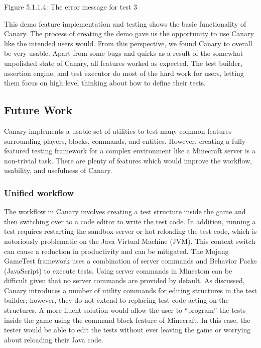 \documentclass{article}
\begin{document}
\begin{onehalfspacing}
Figure 5.1.1.4: The error message for test 3

This demo feature implementation and testing shows the basic
functionality of Canary. The process of creating the demo gave us the
opportunity to use Canary like the intended users would. From this
perspective, we found Canary to overall be very usable. Apart from some
bugs and quirks as a result of the somewhat unpolished state of Canary,
all features worked as expected. The test builder, assertion engine, and
test executor do most of the hard work for users, letting them focus on
high level thinking about how to define their tests.

\subsection{Future Work}

Canary implements a usable set of utilities to test many common features
surrounding players, blocks, commands, and entities. However, creating a
fully-featured testing framework for a complex environment like a
Minecraft server is a non-trivial task. There are plenty of features
which would improve the workflow, usability, and usefulness of Canary.

\subsubsection{Unified workflow}

The workflow in Canary involves creating a test structure inside the
game and then switching over to a code editor to write the test code. In
addition, running a test requires restarting the sandbox server or hot
reloading the test code, which is notoriously problematic on the Java
Virtual Machine (JVM). This context switch can cause a reduction in
productivity and can be mitigated. The Mojang GameTest framework uses a
combination of server commands and Behavior Packs (JavaScript) to
execute tests. Using server commands in Minestom can be difficult given
that no server commands are provided by default. As discussed, Canary
introduces a number of utility commands for editing structures in the
test builder; however, they do not extend to replacing test code acting
on the structures. A more fluent solution would allow the user to
``program'' the tests inside the game using the command block feature of
Minecraft. In this case, the tester would be able to edit the tests
without ever leaving the game or worrying about reloading their Java
code.


\end{onehalfspacing}
\end{document}
